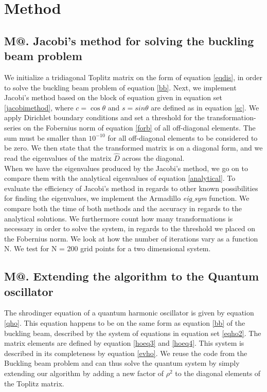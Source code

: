 \documentclass[%
reprint,
amsmath,amssymb,
aps,
]{revtex4-1}
\makeatletter
\newcommand*{\rom}[1]{\expandafter\@slowromancap\romannumeral #1@}
\makeatother
\begin{document}
\section*{Method}
\subsection*{M\rom{1}. Jacobi's method for solving the buckling beam problem}
\noindent We initialize a tridiagonal Toplitz matrix on the form of equation \ref{eqdis}, in order to solve the buckling beam problem of equation \ref{bb}. Next, we implement Jacobi's method based on the block of equation given in equation set \ref{jacobimethod}, where $c = \cos{\theta}$ and $s = sin{\theta}$ are defined as in equation \ref{sc}. We apply Dirichlet boundary conditions and set a threshold for the transformation-series on the Fobernius norm of equation \ref{forb} of all off-diagonal elements. The sum must be smaller than $10^{-10}$ for all off-diagonal elements to be considered to be zero. We then state that the transformed matrix is on a diagonal form, and we read the eigenvalues of the matrix $\hat{D}$ across the diagonal. \\ \indent 
When we have the eigenvalues produced by the Jacobi's method, we go on to compare them with the analytical eigenvalues of equation \ref{analytical}. To evaluate the efficiency of Jacobi's method in regards to other known possibilities for finding the eigenvalues, we implement the Armadillo \textit{eig$\_$sym} function. We compare both the time of both methods and the accuracy in regards to the analytical solutions. We furthermore count how many transformations is necessary in order to solve the system, in regards to the threshold we placed on the Fobernius norm. We look at how  the number of iterations vary as a function N. We test for N = 200 grid points for a two dimensional system. 

\subsection*{M\rom{2}. Extending the algorithm to the Quantum oscillator} \noindent
The shrodinger equation of a quantum harmonic oscillator is given by  equation \ref{qho}. This equation happens to be on the same form as equation \ref{bb} of the buckling beam, described by the system of equations in equation set \ref{eqho2}. The matrix elements are defined by equation \ref{hoeq3} and \ref{hoeq4}. This system is described in its completeness by equation \ref{evho}. We reuse the code from the Buckling beam problem and can thus solve the quantum system by simply extending our algorithm by adding a new factor of $\rho^2$ to the diagonal elements of the Toplitz matrix. 
\end{document}
